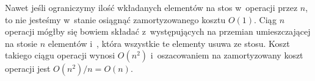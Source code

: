 
\exercise %
Nawet jeśli ograniczymy ilość wkładanych elementów na stos w~operacji  przez $n$, to nie jesteśmy w~stanie osiągnąć zamortyzowanego kosztu $O(1)$.
Ciąg $n$ operacji mógłby się bowiem składać z~występujących na przemian  umieszczającej na stosie $n$ elementów i~, która wszystkie te elementy usuwa ze stosu.
Koszt takiego ciągu operacji wynosi $O(n^2)$ i~oszacowaniem na zamortyzowany koszt operacji jest $O(n^2)/n=O(n)$.

\exercise %
\exercise %
